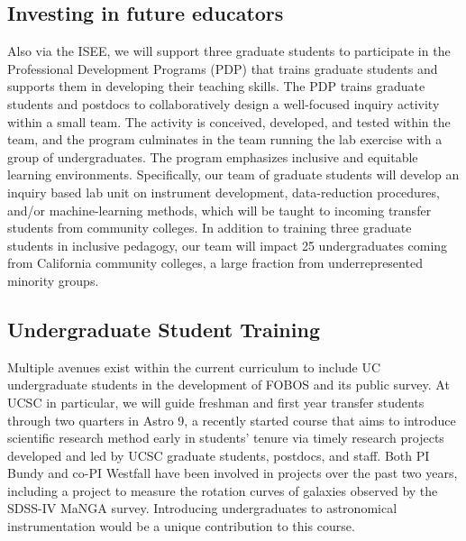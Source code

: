 \documentclass[oneside,11pt]{amsart}
\begin{document}
\subsection{Investing in future educators} Also via the ISEE, we will
support three graduate students to participate in the Professional
Development Programs (PDP) that trains graduate students and supports
them in developing their teaching skills.  The PDP trains graduate
students and postdocs to collaboratively design a well-focused inquiry
activity within a small team.  The activity is conceived, developed, and
tested within the team, and the program culminates in the team running
the lab exercise with a group of undergraduates.  The program emphasizes
inclusive and equitable learning environments.  Specifically, our team
of graduate students will develop an inquiry based lab unit on
instrument development, data-reduction procedures, and/or
machine-learning methods, which will be taught to incoming transfer
students from community colleges.  In addition to training three
graduate students in inclusive pedagogy, our team will impact 25
undergraduates coming from California community colleges, a large
fraction from underrepresented minority groups.

\subsection{Undergraduate Student Training} Multiple avenues exist
within the current curriculum to include UC undergraduate students in
the development of FOBOS and its public survey.  At UCSC in particular,
we will guide freshman and first year transfer students through two
quarters in Astro 9, a recently started course that aims to introduce
scientific research method early in students' tenure via timely research
projects developed and led by UCSC graduate students, postdocs, and
staff.  Both PI Bundy and co-PI Westfall have been involved in projects
over the past two years, including a project to measure the rotation
curves of galaxies observed by the SDSS-IV MaNGA survey.  Introducing
undergraduates to astronomical instrumentation would be a unique
contribution to this course.


\end{document}
